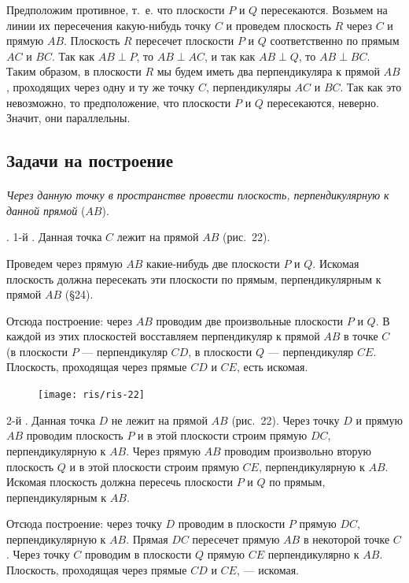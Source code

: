 \documentclass[twoside]{book}
\begin{document}
Предположим противное, т.~е. что плоскости $P$ и $Q$ пересекаются.
Возьмем на линии их пересечения какую-нибудь точку $C$ и проведем плоскость $R$ через $C$ и прямую $AB$.
Плоскость $R$ пересечет плоскости $P$ и $Q$ соответственно по прямым $AC$ и $BC$.
Так как $AB\perp P$, то $AB\perp AC$, и так как $AB\perp Q$, то $AB\perp BC$.
Таким образом, в плоскости $R$ мы будем иметь два перпендикуляра к прямой $AB$, проходящих через одну и ту же точку $C$, перпендикуляры $AC$ и $BC$.
Так как это невозможно, то предположение, что плоскости $P$ и $Q$ пересекаются, неверно.
Значит, они параллельны.

\subsection*{Задачи на построение}

\paragraph{}\label{1938/s35}
\emph{Через данную точку в пространстве провести плоскость, перпендикулярную к данной прямой} ($AB$).

.
1-й .
Данная точка $C$ лежит на прямой $AB$ (рис.~22).

Проведем через прямую $AB$ какие-нибудь две плоскости $P$ и $Q$.
Искомая плоскость должна пересекать эти плоскости по прямым, перпендикулярным к прямой $AB$ (§24).

Отсюда построение: через $AB$ проводим две произвольные плоскости $P$ и $Q$.
В каждой из этих плоскостей восставляем перпендикуляр к прямой $AB$ в точке $C$ (в плоскости $P$ --- перпендикуляр $CD$, в плоскости $Q$ --- перпендикуляр $CE$.
Плоскость, проходящая через прямые $CD$ и $CE$, есть искомая.

\begin{figure}[h!]
\centering
\texttt{[image: ris/ris-22]}
\caption{}
\end{figure}

2-й .
Данная точка $D$ не лежит на прямой $AB$ (рис.~22).
Через точку $D$ и прямую $AB$ проводим плоскость $P$ и в этой плоскости строим прямую $DC$, перпендикулярную к $AB$.
Через прямую $AB$ проводим произвольно вторую плоскость $Q$ и в этой плоскости строим прямую $CE$, перпендикулярную к $AB$.
Искомая плоскость должна пересечь плоскости $P$ и $Q$ по прямым, перпендикулярным к $AB$.

Отсюда построение: через точку $D$ проводим в плоскости $P$ прямую $DC$, перпендикулярную к $AB$.
Прямая $DC$ пересечет прямую $AB$ в некоторой точке $C$.
Через точку $C$ проводим в плоскости $Q$ прямую $CE$ перпендикулярно к $AB$.
Плоскость, проходящая через прямые $CD$ и $CE$, --- искомая.
\end{document}

